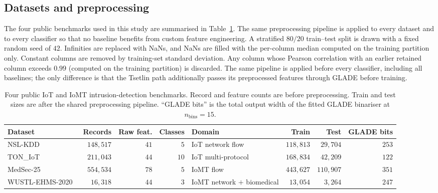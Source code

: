 \documentclass[journal,10pt]{IEEEtran}
\begin{document}
\subsection{Datasets and preprocessing}
\label{sec:datasets}
The four public benchmarks used in this study are summarised in
Table~\ref{tab:datasets}. The same preprocessing pipeline is applied
to every dataset and to every classifier so that no baseline benefits
from custom feature engineering. A stratified $80/20$ train--test
split is drawn with a fixed random seed of $42$.
Infinities are replaced with NaNs, and NaNs are filled with the
per-column median computed on the training partition only. Constant
columns are removed by training-set standard deviation. Any column
whose Pearson correlation with an earlier retained column exceeds
$0.99$ (computed on the training partition) is discarded. The same
pipeline is applied before every classifier, including all baselines;
the only difference is that the Tsetlin path additionally passes its
preprocessed features through GLADE before training.

\begin{table}[t]
\caption{Four public IoT and IoMT intrusion-detection benchmarks.
         Record and feature counts are before preprocessing. Train and
         test sizes are after the shared preprocessing pipeline.
         ``GLADE bits'' is the total output width of the fitted GLADE
         binariser at $n_\text{bins}=15$.}
\label{tab:datasets}
\centering\small
\begin{tabular}{lrrrlrrr}
\toprule
\textbf{Dataset} & \textbf{Records} & \textbf{Raw feat.} &
\textbf{Classes} & \textbf{Domain} &
\textbf{Train} & \textbf{Test} & \textbf{GLADE bits} \\
\midrule
NSL-KDD~\cite{tavallaee2009nslkdd}       & $148{,}517$ & $41$ & $5$  & IoT network flow             & $118{,}813$ & $29{,}704$  & $253$ \\
TON\_IoT~\cite{moustafa2021ton}          & $211{,}043$ & $44$ & $10$ & IoT multi-protocol           & $168{,}834$ & $42{,}209$  & $122$ \\
MedSec-25                                & $554{,}534$ & $78$ & $5$  & IoMT flow                    & $443{,}627$ & $110{,}907$ & $351$ \\
WUSTL-EHMS-2020~\cite{hady2020wustl}     & $16{,}318$  & $44$ & $3$  & IoMT network $+$ biomedical  & $13{,}054$  & $3{,}264$   & $247$ \\
\bottomrule
\end{tabular}
\end{table}
\end{document}
